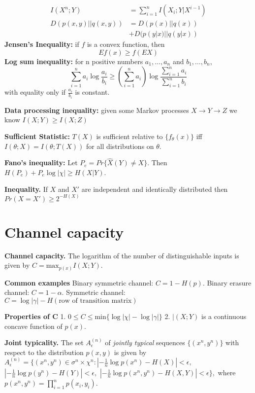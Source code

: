 \documentclass[10pt]{article}
\begin{document}
\begin{tiny}
\begin{multicols}{3}
\begin{align}
I(X^n;Y)&=\sum_{i=1}^n I(X_i;Y|X^{i-1})\\
D(p(x,y)||q(x,y))&=D(p(x)||q(x))\\
&+D(p(y|x)||q(y|x))
\end{align}
{\bf Jensen's Inequality:} if $f$ is a convex function, then
\begin{equation}
Ef(x) \geq f(EX)
\end{equation}
{\bf Log sum inequality:} for n positive numbers $a_1,\ldots,a_n$ and $b_1,\ldots,b_n$,
\begin{equation}
\sum_{i=1}^n a_i \log \frac{a_i}{b_i} \geq \left( \sum_{i=1}^n a_i \right) \log \frac{\sum_{i=1}^n a_i}{\sum_{i=1}^n b_i}
\end{equation}
with equality only if $\frac{a_i}{b_i}$ is constant. 

{\bf Data processing inequality:} given some Markov processes $X\rightarrow Y\rightarrow Z$ we know $I(X;Y)\geq I(X;Z)$

{\bf Sufficient Statistic:} $T(X)$ is sufficient relative to $\{f_\theta (x)\}$ iff $I(\theta;X)=I(\theta;T(X))$ for all distributions on $\theta$.

{\bf Fano's inequality:} Let $P_e=Pr\{\hat{X}(Y)\neq X\}$. Then $H(P_e)+P_e \log |\chi| \geq H(X|Y)$.

{\bf Inequality.} If $X$ and $X'$ are independent and identically distributed then $Pr(X=X') \geq 2^{-H(X)}$


\section*{Channel capacity}
{\bf Channel capacity.} The logarithm of the number of distinguishable inputs is given by $ C= \text{max}_{p(x)} I(X;Y).$

{\bf Common examples} Binary symmetric channel: $C= 1 - H(p)$. Binary erasure channel: $C = 1 - \alpha$. Symmetric channel: $C= \log |\gamma | - H(\text{row of transition matrix})$

{\bf Properties of C}  1. $0 \leq C \leq \text{min}\{\log |\chi| - \log | \gamma | \}$  2. $|(X;Y)$ is a continuous concave function of $p(x)$.

{\bf Joint typicality.}  The set $A_{\epsilon}^{(n)}$ of {\it jointly typical} sequences $\{(x^{n},y^{n})\}$ with respect to the distribution $p(x,y)$ is given by $A_{\epsilon}^{(n)} = \{ (x^{n},y^{n}) \in \sigma^{n} \times \chi^{n}: \left| -\frac{1}{n}\log p(x^{n}) - H(X) \right| < \epsilon, $ $\left| -\frac{1}{n}\log p(y^{n}) - H(Y) \right| <\epsilon, $ $\left| -\frac{1}{n} \log p(x^{n},y^{n})-H(X,Y) \right| <\epsilon \}, $ where $p(x^{n},y^{n}) = \prod_{i=1}^{n}p(x_{i},y_{i}).$



\end{multicols}
\end{tiny}
\end{document}
